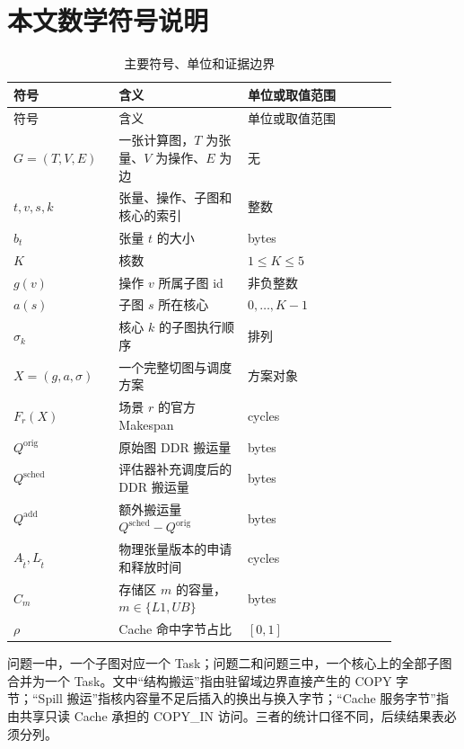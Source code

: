 \section{本文数学符号说明}
\begin{longtable}{p{0.20\linewidth}p{0.30\linewidth}p{0.35\linewidth}}
\caption{主要符号、单位和证据边界}\\\toprule
符号 & 含义 & 单位或取值范围\\\midrule
\endfirsthead
\toprule 符号 & 含义 & 单位或取值范围\\\midrule
\endhead
$G=(T,V,E)$ & 一张计算图，$T$ 为张量、$V$ 为操作、$E$ 为边 & 无\\
$t,v,s,k$ & 张量、操作、子图和核心的索引 & 整数\\
$b_t$ & 张量 $t$ 的大小 & bytes\\
$K$ & 核数 & $1\le K\le5$\\
$g(v)$ & 操作 $v$ 所属子图 id & 非负整数\\
$a(s)$ & 子图 $s$ 所在核心 & $0,\ldots,K-1$\\
$\sigma_k$ & 核心 $k$ 的子图执行顺序 & 排列\\
$X=(g,a,\sigma)$ & 一个完整切图与调度方案 & 方案对象\\
$F_r(X)$ & 场景 $r$ 的官方 Makespan & cycles\\
$Q^{\mathrm{orig}}$ & 原始图 DDR 搬运量 & bytes\\
$Q^{\mathrm{sched}}$ & 评估器补充调度后的 DDR 搬运量 & bytes\\
$Q^{\mathrm{add}}$ & 额外搬运量 $Q^{\mathrm{sched}}-Q^{\mathrm{orig}}$ & bytes\\
$A_{\tilde t},L_{\tilde t}$ & 物理张量版本的申请和释放时间 & cycles\\
$C_m$ & 存储区 $m$ 的容量，$m\in\{L1,UB\}$ & bytes\\
$\rho$ & Cache 命中字节占比 & $[0,1]$\\
\bottomrule
\end{longtable}

问题一中，一个子图对应一个 Task；问题二和问题三中，一个核心上的全部子图合并为一个 Task。文中“结构搬运”指由驻留域边界直接产生的 COPY 字节；“Spill 搬运”指核内容量不足后插入的换出与换入字节；“Cache 服务字节”指由共享只读 Cache 承担的 COPY\_IN 访问。三者的统计口径不同，后续结果表必须分列。
